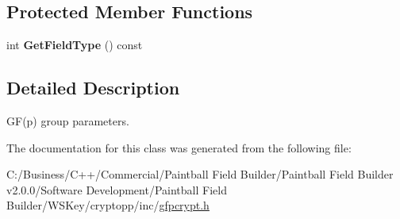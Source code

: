 \subsection*{Protected Member Functions}
\begin{DoxyCompactItemize}
\item 
\hypertarget{class_d_l___group_parameters___g_f_p_a87abebabae554edd08e192a17df26498}{
int {\bfseries GetFieldType} () const }
\label{class_d_l___group_parameters___g_f_p_a87abebabae554edd08e192a17df26498}

\end{DoxyCompactItemize}


\subsection{Detailed Description}
GF(p) group parameters. 

The documentation for this class was generated from the following file:\begin{DoxyCompactItemize}
\item 
C:/Business/C++/Commercial/Paintball Field Builder/Paintball Field Builder v2.0.0/Software Development/Paintball Field Builder/WSKey/cryptopp/inc/\hyperlink{gfpcrypt_8h}{gfpcrypt.h}\end{DoxyCompactItemize}
